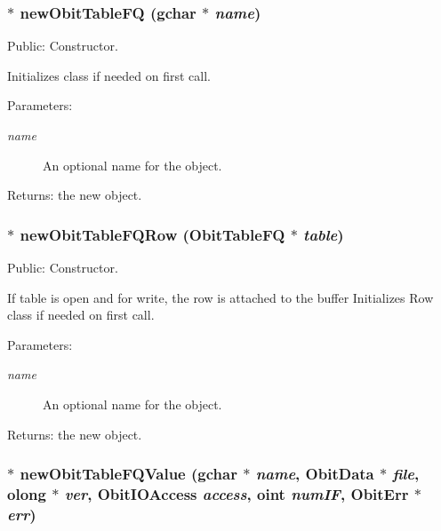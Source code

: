 \subsubsection{$\ast$ new\-Obit\-Table\-FQ (gchar $\ast$ {\em name})}\label{ObitTableFQ_8c_a16}


Public: Constructor. 

Initializes class if needed on first call. \begin{Desc}
\item[Parameters:]
\begin{description}
\item[{\em name}]An optional name for the object. \end{description}
\end{Desc}
\begin{Desc}
\item[Returns:]the new object. \end{Desc}
\subsubsection{$\ast$ new\-Obit\-Table\-FQRow ({\bf Obit\-Table\-FQ} $\ast$ {\em table})}\label{ObitTableFQ_8c_a14}


Public: Constructor. 

If table is open and for write, the row is attached to the buffer Initializes Row class if needed on first call. \begin{Desc}
\item[Parameters:]
\begin{description}
\item[{\em name}]An optional name for the object. \end{description}
\end{Desc}
\begin{Desc}
\item[Returns:]the new object. \end{Desc}
\subsubsection{$\ast$ new\-Obit\-Table\-FQValue (gchar $\ast$ {\em name}, {\bf Obit\-Data} $\ast$ {\em file}, {\bf olong} $\ast$ {\em ver}, Obit\-IOAccess {\em access}, {\bf oint} {\em num\-IF}, {\bf Obit\-Err} $\ast$ {\em err})}\label{ObitTableFQ_8c_a18}


